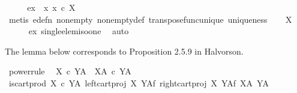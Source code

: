 \begin{isabellebody}
\ \ \isamarkupfalse%
\ \isamarkupfalse%
\ ex{}{\isacharcolon}{\kern0pt}\ {\isachardoublequoteopen}{\isacharparenleft}{\kern0pt}{\isasymexists}{\isacharbang}{\kern0pt}\ x{\isachardot}{\kern0pt}\ x\ {\isasymin}\isactrlsub c\ {\isasymone}\isactrlbsup X\isactrlesup {\isacharparenright}{\kern0pt}{\isachardoublequoteclose}\isanewline
\ \ \ \ \isamarkupfalse%
\ {\isacharparenleft}{\kern0pt}metis\ e{\isacharunderscore}{\kern0pt}defn\ nonempty\ nonempty{\isacharunderscore}{\kern0pt}def\ transpose{\isacharunderscore}{\kern0pt}func{\isacharunderscore}{\kern0pt}unique\ uniqueness{\isacharparenright}{\kern0pt}\isanewline
\ \ \isamarkupfalse%
\ {\isachardoublequoteopen}{\isasymone}\isactrlbsup X\isactrlesup \ {\isasymcong}\ {\isasymone}{\isachardoublequoteclose}\isanewline
\ \ \ \ \isamarkupfalse%
\ ex{}\ single{\isacharunderscore}{\kern0pt}elem{\isacharunderscore}{\kern0pt}iso{\isacharunderscore}{\kern0pt}one\ \isamarkupfalse%
\ auto\isanewline
{}\isamarkupfalse%
%
\endisatagproof
{\isafoldproof}%
%
\isadelimproof
%
\endisadelimproof
%
\begin{isamarkuptext}%
The lemma below corresponds to Proposition 2.5.9 in Halvorson.%
\end{isamarkuptext}\isamarkuptrue%
\isamarkupfalse%
\ power{\isacharunderscore}{\kern0pt}rule{\isacharcolon}{\kern0pt}\isanewline
\ \ {\isachardoublequoteopen}{\isacharparenleft}{\kern0pt}X\ {\isasymtimes}\isactrlsub c\ Y{\isacharparenright}{\kern0pt}\isactrlbsup A\isactrlesup \ {\isasymcong}\ X\isactrlbsup A\isactrlesup \ {\isasymtimes}\isactrlsub c\ Y\isactrlbsup A\isactrlesup {\isachardoublequoteclose}\isanewline
%
\isadelimproof
%
\endisadelimproof
%
\isatagproof
{}\isamarkupfalse%
\ {\isacharminus}{\kern0pt}\ \isanewline
\ \ \isamarkupfalse%
\ {\isachardoublequoteopen}is{\isacharunderscore}{\kern0pt}cart{\isacharunderscore}{\kern0pt}prod\ {\isacharparenleft}{\kern0pt}{\isacharparenleft}{\kern0pt}X\ {\isasymtimes}\isactrlsub c\ Y{\isacharparenright}{\kern0pt}\isactrlbsup A\isactrlesup {\isacharparenright}{\kern0pt}\ {\isacharparenleft}{\kern0pt}{\isacharparenleft}{\kern0pt}left{\isacharunderscore}{\kern0pt}cart{\isacharunderscore}{\kern0pt}proj\ X\ Y{\isacharparenright}{\kern0pt}\isactrlbsup A\isactrlesup \isactrlsub f{\isacharparenright}{\kern0pt}\ {\isacharparenleft}{\kern0pt}right{\isacharunderscore}{\kern0pt}cart{\isacharunderscore}{\kern0pt}proj\ X\ Y\isactrlbsup A\isactrlesup \isactrlsub f{\isacharparenright}{\kern0pt}\ {\isacharparenleft}{\kern0pt}X\isactrlbsup A\isactrlesup {\isacharparenright}{\kern0pt}\ {\isacharparenleft}{\kern0pt}Y\isactrlbsup A\isactrlesup {\isacharparenright}{\kern0pt}{\isachardoublequoteclose}\isanewline

\end{isabellebody}
